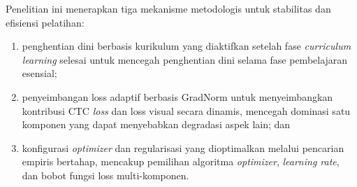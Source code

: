\documentclass[12pt,a4paper]{article}
\begin{document}
\begin{enumerate}[label=Fase \arabic*, wide=0pt, itemsep=1em, resume]
    Penelitian ini menerapkan tiga mekanisme metodologis untuk stabilitas dan efisiensi pelatihan:
    \begin{enumerate}[label=(\arabic*), leftmargin=*, nosep]
        \item penghentian dini berbasis kurikulum yang diaktifkan setelah fase \textit{curriculum learning} selesai untuk mencegah penghentian dini selama fase pembelajaran esensial;
        \item penyeimbangan loss adaptif berbasis GradNorm untuk menyeimbangkan kontribusi CTC \textit{loss} dan loss visual secara dinamis, mencegah dominasi satu komponen yang dapat menyebabkan degradasi aspek lain; dan
        \item konfigurasi \textit{optimizer} dan regularisasi yang dioptimalkan melalui pencarian empiris bertahap, mencakup pemilihan algoritma \textit{optimizer}, \textit{learning rate}, dan bobot fungsi loss multi-komponen.
    \end{enumerate}
\end{enumerate}
\end{document}
